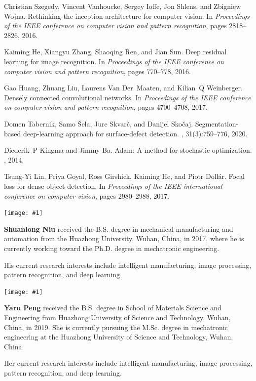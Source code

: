 \documentclass[sn-mathphys]{sn-jnl}%
\theoremstyle{thmstyleone}%
\theoremstyle{thmstyletwo}%
\theoremstyle{thmstylethree}%
\newcommand{\Biography}[3]{
\vspace{0.9cm}
\noindent\texttt{[image: \#1]}

\noindent\small #2}
\begin{document}
\begin{thebibliography}{10}
Christian Szegedy, Vincent Vanhoucke, Sergey Ioffe, Jon Shlens, and Zbigniew
  Wojna.
\newblock Rethinking the inception architecture for computer vision.
\newblock In {\em Proceedings of the IEEE conference on computer vision and
  pattern recognition}, pages 2818--2826, 2016.

Kaiming He, Xiangyu Zhang, Shaoqing Ren, and Jian Sun.
\newblock Deep residual learning for image recognition.
\newblock In {\em Proceedings of the IEEE conference on computer vision and
  pattern recognition}, pages 770--778, 2016.

Gao Huang, Zhuang Liu, Laurens Van Der~Maaten, and Kilian~Q Weinberger.
\newblock Densely connected convolutional networks.
\newblock In {\em Proceedings of the IEEE conference on computer vision and
  pattern recognition}, pages 4700--4708, 2017.

Domen Tabernik, Samo {\v{S}}ela, Jure Skvar{\v{c}}, and Danijel Sko{\v{c}}aj.
\newblock Segmentation-based deep-learning approach for surface-defect
  detection.
, 31(3):759--776, 2020.

Diederik~P Kingma and Jimmy Ba.
\newblock Adam: A method for stochastic optimization.
, 2014.

Tsung-Yi Lin, Priya Goyal, Ross Girshick, Kaiming He, and Piotr Doll{\'a}r.
\newblock Focal loss for dense object detection.
\newblock In {\em Proceedings of the IEEE international conference on computer
  vision}, pages 2980--2988, 2017.

\end{thebibliography}

\Biography{bio-ShuanlongNiu.jpeg}{\textbf{Shuanlong Niu} received the B.S. degree in mechanical manufacturing and automation from the Huazhong University, Wuhan, China, in 2017, where he is currently working toward the Ph.D. degree in mechatronic engineering. 

His current research interests include intelligent manufacturing, image processing, pattern recognition, and  deep learning}{width=3cm,height=3.8cm}

\Biography{bio-YaruPeng.jpeg}{\textbf{Yaru Peng} received the B.S. degree in School of Materials Science and Engineering from Huazhong University of Science and Technology, Wuhan, China, in 2019. She is currently pursuing the M.Sc. degree in mechatronic engineering at the Huazhong University of Science and Technology, Wuhan, China. 

Her current research interests include intelligent manufacturing, image processing, pattern recognition, and deep learning.}{width=3cm,height=3.8cm}
\end{document}
